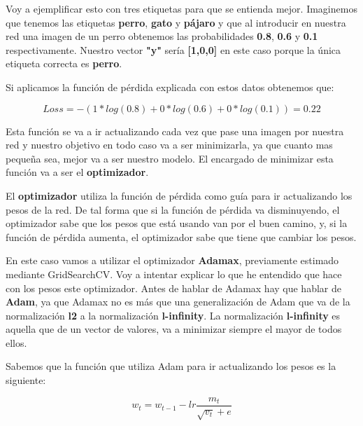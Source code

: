 Voy a ejemplificar esto con tres etiquetas para que se entienda mejor. Imaginemos que tenemos las etiquetas \textbf{perro}, \textbf{gato} y \textbf{pájaro} y que al introducir en nuestra red una imagen de un perro obtenemos las probabilidades \textbf{0.8}, \textbf{0.6} y \textbf{0.1} respectivamente. Nuestro vector \textbf{"y"} sería \textbf{[1,0,0]} en este caso porque la única etiqueta correcta es \textbf{perro}.

\vspace{2 mm}

Si aplicamos la función de pérdida explicada con estos datos obtenemos que:

\[Loss = - (1*log(0.8) + 0*log(0.6) + 0*log(0.1)) = 0.22\]


\vspace{2 mm}

Esta función se va a ir actualizando cada vez que pase una imagen por nuestra red y nuestro objetivo en todo caso va a ser minimizarla, ya que cuanto mas pequeña sea, mejor va a ser nuestro modelo. El encargado de minimizar esta función va a ser el \textbf{optimizador}.

\vspace{5 mm}

El \textbf{optimizador} utiliza la función de pérdida como guía para ir actualizando los pesos de la red. De tal forma que si la función de pérdida va disminuyendo, el optimizador sabe que los pesos que está usando van por el buen camino, y, si la función de pérdida aumenta, el optimizador sabe que tiene que cambiar los pesos.

\vspace{2 mm}

En este caso vamos a utilizar el optimizador \textbf{Adamax}, previamente estimado mediante GridSearchCV. Voy a intentar explicar lo que he entendido que hace con los pesos este optimizador. Antes de hablar de Adamax hay que hablar de \textbf{Adam}, ya que Adamax no es más que una generalización de Adam que va de la normalización \textbf{l2} a la normalización \textbf{l-infinity}. La normalización \textbf{l-infinity} es aquella que de un vector de valores, va a minimizar siempre el mayor de todos ellos.

\vspace{5 mm}

Sabemos que la función que utiliza Adam para ir actualizando los pesos es la siguiente:

\[w_t = w_{t-1} - lr  \frac{m_t}{\sqrt{v_t} + e} \]

